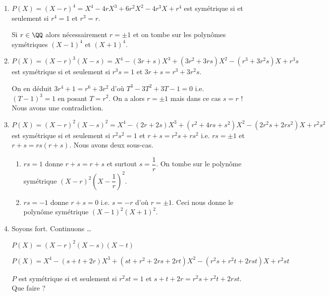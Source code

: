 \documentclass[12pt]{amsart}
\begin{document}
\begin{enumerate}
	\item $P(X) = (X - r)^4
	            = X^4
	            - 4 r X^3
	            + 6 r^2 X^2
	            - 4 r^3 X
	            + r^4$
	       est symétrique si et seulement si $r^4 = 1$ et $r^3 = r$.
	       
	       \noindent Si $r\in \QQ$ alors nécessairement $r = \pm 1$ et on tombe sur les polynômes symétriques $(X - 1)^4$ et $(X + 1)^4$.

	\item $P(X) = (X - r)^3 (X - s)
	            = X^4
	            - (3 r + s) X^3
	            + (3 r^2 + 3 r s) X^2
	            - (r^3 + 3 r^2 s) X
	            + r^3 s$
	       est symétrique si et seulement si $r^3 s = 1$ et $3 r + s = r^3 + 3 r^2 s$.
	       
	       \noindent On en déduit $3 r^4 + 1 = r^6 + 3 r^2$
	       d'où $T^3 - 3 T^2 + 3 T - 1 = 0$ i.e. $(T - 1)^3 = 1$
	       en posant $T = r^2$.
	       On a alors $r = \pm 1$ mais dans ce cas $s = r$ !
	       Nous avons une contradiction. 


	\item $P(X) = (X - r)^2 (X - s)^2
	            = X^4
	            - (2 r  + 2 s) X^3
	            + (r^2 + 4 r s + s^2) X^2
	            - (2 r^2 s + 2 r s^2) X
	            + r^2 s^2
	            $
	       est symétrique si et seulement si
	       $r^2 s^2 = 1$ et $r + s = r^2 s + r s^2$
	       i.e. $r s = \pm 1$ et $r + s = rs(r + s)$. Nous avons deux sous-cas.
		   \begin{enumerate}
			   \item $r s = 1$ donne $r  + s = r + s$ et surtout $s = \dfrac1r$.
			   On tombe sur le polynôme symétrique $(X - r)^2 \left( X - \dfrac1r \right)^2$.

			   \item $r s = -1$ donne $r  + s = 0$ i.e. $s = - r$ d'où $r = \pm 1$.
			   Ceci nous donne le polynôme symétrique $(X - 1)^2 ( X + 1)^2$.
		   \end{enumerate}
	
	\item Soyons fort. Continuons \dots
	
		  \noindent $P(X) = (X - r)^2 (X - s) (X - t)$
	
		  \noindent $P(X) = X^4
	            - (s + t + 2 r) X^3
	            + (s t + r^2 + 2 r s + 2 r t) X^2
	            - (r^2 s + r^2 t + 2 r s t) X 
	            + r^2 s t$
	       	
		  \noindent $P$ est symétrique si et seulement si
	       $r^2 s t = 1$ et $s + t + 2 r = r^2 s + r^2 t + 2 r s t$. Que faire ?
\end{enumerate}
\end{document}
